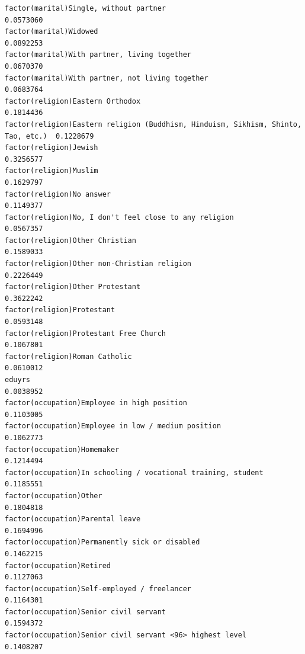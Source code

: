 \documentclass[
]{article}
\begin{document}
\begin{table}
\begin{minipage}[t]{\linewidth}
{\begin{verbatim}
factor(marital)Single, without partner                                             0.0573060
factor(marital)Widowed                                                             0.0892253
factor(marital)With partner, living together                                       0.0670370
factor(marital)With partner, not living together                                   0.0683764
factor(religion)Eastern Orthodox                                                   0.1814436
factor(religion)Eastern religion (Buddhism, Hinduism, Sikhism, Shinto, Tao, etc.)  0.1228679
factor(religion)Jewish                                                             0.3256577
factor(religion)Muslim                                                             0.1629797
factor(religion)No answer                                                          0.1149377
factor(religion)No, I don't feel close to any religion                             0.0567357
factor(religion)Other Christian                                                    0.1589033
factor(religion)Other non-Christian religion                                       0.2226449
factor(religion)Other Protestant                                                   0.3622242
factor(religion)Protestant                                                         0.0593148
factor(religion)Protestant Free Church                                             0.1067801
factor(religion)Roman Catholic                                                     0.0610012
eduyrs                                                                             0.0038952
factor(occupation)Employee in high position                                        0.1103005
factor(occupation)Employee in low / medium position                                0.1062773
factor(occupation)Homemaker                                                        0.1214494
factor(occupation)In schooling / vocational training, student                      0.1185551
factor(occupation)Other                                                            0.1804818
factor(occupation)Parental leave                                                   0.1694996
factor(occupation)Permanently sick or disabled                                     0.1462215
factor(occupation)Retired                                                          0.1127063
factor(occupation)Self-employed / freelancer                                       0.1164301
factor(occupation)Senior civil servant                                             0.1594372
factor(occupation)Senior civil servant <96> highest level                          0.1408207

\end{verbatim}}
\end{minipage}
\end{table}
\end{document}
